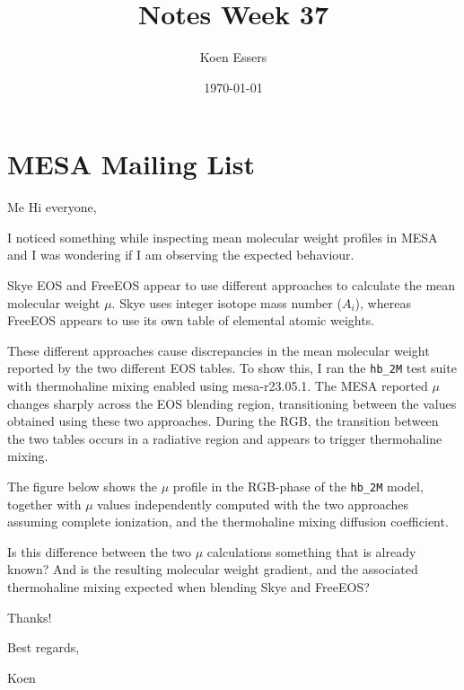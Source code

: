 \documentclass[a4paper,10pt]{article}
\title{Notes Week 37}
\author{Koen Essers}
\date{\today}
\begin{document}
\setuplayout
\section{MESA Mailing List}

\begin{minipage}{1.55\textwidth}
	\begin{shadequote}{Me}
		Hi everyone,

		I noticed something while inspecting mean molecular weight profiles in MESA and I was wondering if I am observing the expected behaviour.

		Skye EOS and FreeEOS appear to use different approaches to calculate the mean molecular weight \(\mu \).
		Skye uses integer isotope mass number (\(A_{i} \)), whereas FreeEOS appears to use its own table of elemental atomic weights.

		These different approaches cause discrepancies in the mean molecular weight reported by the two different EOS tables.
		To show this, I ran the \lstinline[style=output, breaklines=true]|hb_2M| test suite with thermohaline mixing enabled using mesa-r23.05.1.
		The MESA reported \(\mu \) changes sharply across the EOS blending region, transitioning between the values obtained using these two approaches.
		During the RGB, the transition between the two tables occurs in a radiative region and appears to trigger thermohaline mixing.

		The figure below shows the \(\mu \) profile in the RGB-phase of the \lstinline[style=output, breaklines=true]|hb_2M| model, together with \(\mu \) values independently computed with the two approaches assuming complete ionization, and the thermohaline mixing diffusion coefficient.

		\begin{center}
		\end{center}

		Is this difference between the two \(\mu \) calculations something that is already known?
		And is the resulting molecular weight gradient, and the associated thermohaline mixing expected when blending Skye and FreeEOS?

		Thanks!

		Best regards,

		Koen
	\end{shadequote}
\end{minipage}
\end{document}
